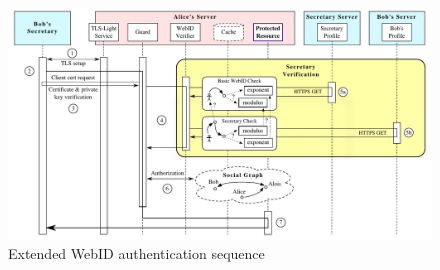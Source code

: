 \documentclass[a4paper]{llncs}
\begin{document}
\begin{figure}[htb]
  \centering
  \includegraphics[width=\textwidth]{AuthSequence}
  \caption{Extended WebID authentication sequence}
  \label{fig:AuthSequence}
\end{figure}

\end{document}

